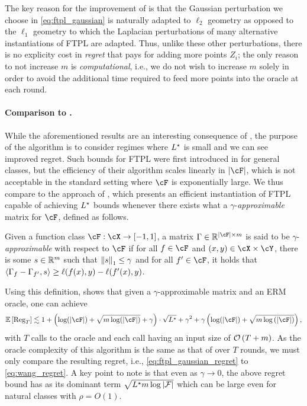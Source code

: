 The key reason for the improvement of  is that the Gaussian perturbation we choose in \eqref{eq:ftpl_gaussian} is naturally adapted to $\ell_2$ geometry as opposed to the $\ell_1$ geometry to which the Laplacian perturbations of many alternative instantiations of FTPL are adapted.  Thus, unlike these other perturbations, there is no explicity cost in \emph{regret} that  pays for adding more points $Z_i$; the only reason to not increase $m$ is \emph{computational}, i.e., we do not wish to increase $m$ solely in order to avoid the additional time required to feed more points into the oracle at each round. 


\paragraph{Comparison to \citet{wang2022adaptive}.} 
While the aforementioned results are an interesting consequence of , the purpose of the algorithm is to consider regimes where $L^\star$ is small and we can see improved regret.  Such bounds for FTPL were first introduced in \citet{hutter2004prediction} for general classes, but the efficiency of their algorithm scales linearly in $\abs{\cF}$, which is not acceptable in the standard setting where $\cF$ is exponentially large.  We thus compare  to the approach of \citet{wang2022adaptive}, which presents an efficient instantiation of FTPL capable of achieving $L^\star$ bounds whenever there exists what  a $\gamma$-\emph{approximable} matrix for $\cF$, defined as follows.
\begin{definition}\label{def:approximable}
    Given a function class $\cF: \cX \to [-1,1]$, a matrix $\Gamma \in \rr^{\abs{\cF} \times m}$ is said to be $\gamma$-\emph{approximable} with respect to $\cF$ if for all $f \in \cF$ and $(x,y) \in \cX \times \cY$, there is some $s \in \mathbb{R}^m$ such that $\left\|s\right\|_1 \leq \gamma$ and for all $f' \in \cF$, it holds that $\left\langle \Gamma_f - \Gamma_{f'} , s \right\rangle \geq \ell(f(x), y) - \ell(f'(x), y)$.
\end{definition}
Using this definition, \citet[Theorem 1]{wang2022adaptive} shows that given a $\gamma$-approximable matrix and an ERM oracle, one can achieve
\begin{align}\label{eq:wang_regret}
    \ee\left[ \reg_T \right] \lesssim 1 + \left( \log(\abs{\cF}) + \sqrt{m \log(\abs{\cF})} + \gamma \right) \cdot \sqrt{\Lstar} + \gamma^2 + \gamma \left( \log(\abs{\cF}) + \sqrt{m \log\left( \abs {\cF} \right)} \right),
\end{align}
with $T$ calls to the oracle and each call having an input size of $\mathcal{O}\left( T + m \right)$.  As the oracle complexity of this algorithm is the same as that of  over $T$ rounds, we must only compare the resulting regret, i.e., \eqref{eq:ftpl_gaussian_regret} to \eqref{eq:wang_regret}.  
A key point to note is that even as $\gamma \to 0 $, the above regret bound has as its dominant term $ \sqrt{ L^\star m  \log \left| \mathcal{F} \right|  } $ which can be large even for natural classes with $ \rho = O(1) $.   

